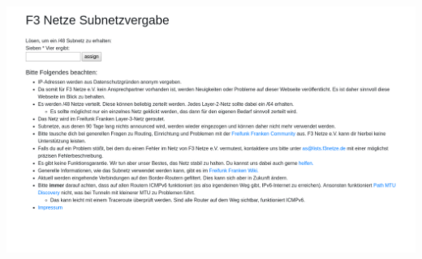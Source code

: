 \documentclass{beamer}
\begin{document}
	\begin{frame}
		\includegraphics[width=\framewidth]{media/f3nsub.png}
	\end{frame}

\end{document}
